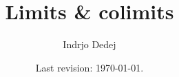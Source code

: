 



\title{Limits \& colimits}
\author{Indrjo Dedej}
\date{Last revision: \today{}.}



\maketitle

\tableofcontents







